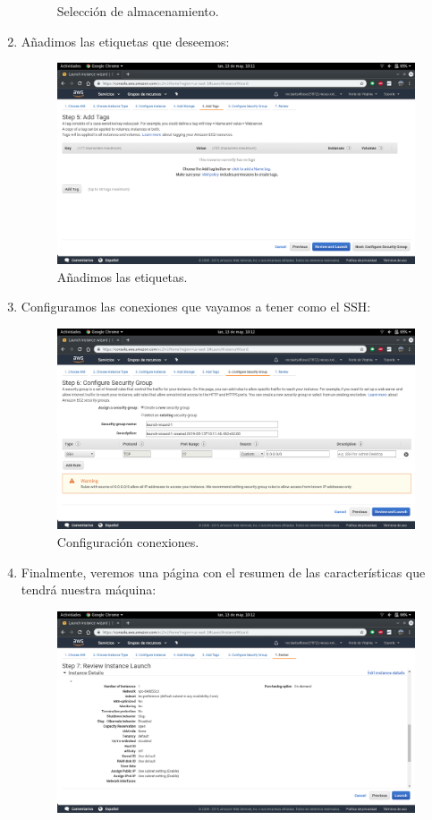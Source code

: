 \begin{enumerate}
\begin{figure}[h]
		\caption{Selección de almacenamiento.}
		\label{Selección de almacenamiento}
	\end{figure}
\newpage
	\item Añadimos las etiquetas que deseemos:
	\begin{figure}[h]
		\centering
		\includegraphics[scale=0.28]{ImagenesAWS/MV/9.png}
		\caption{Añadimos las etiquetas.}
		\label{Añadimos las etiqutas}
	\end{figure}
	\item Configuramos las conexiones que vayamos a tener como el SSH:
	\begin{figure}[h]
		\centering
		\includegraphics[scale=0.28]{ImagenesAWS/MV/10.png}
		\caption{Configuración conexiones.}
		\label{Configuración de conexiones}
	\end{figure}
\newpage
	\item Finalmente, veremos una página con el resumen de las características que tendrá nuestra máquina:
	\begin{figure}[h]
		\centering
		\includegraphics[scale=0.28]{ImagenesAWS/MV/12.png}

\end{figure}
\end{enumerate}

